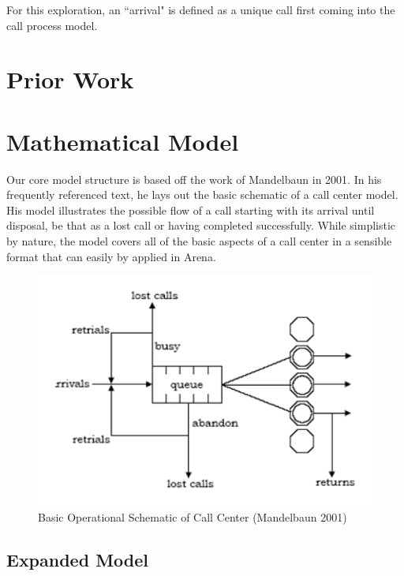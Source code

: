 \documentclass[12pt,twocolumn]{article}
\begin{document}
\par

For this exploration, an ``arrival" is defined as a unique call first coming into the call process model.



\section{Prior Work}


\section{Mathematical Model}

Our core model structure is based off the work of Mandelbaun in 2001.  In his frequently referenced text, he lays out the basic schematic of a call center model.  His model illustrates the possible flow of a call starting with its arrival until disposal, be that as a lost call or having completed successfully.\cite{mandelbaun}  While simplistic by nature, the model covers all of the basic aspects of a call center in a sensible format that can easily by applied in Arena.  

	\begin{figure}[h]
	\includegraphics[scale=.45]{call_center_layout.png}
	\caption{Basic Operational Schematic of Call Center (Mandelbaun 2001)}
	\end{figure}


\subsection{Expanded Model}
\end{document}
